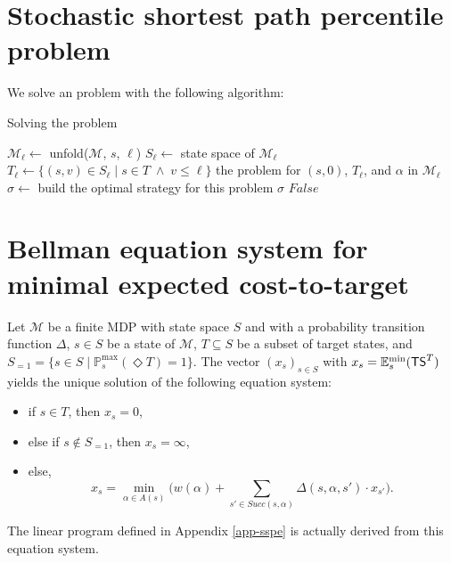 \section{Stochastic shortest path percentile problem}
\label{sspp-appendix}
We solve an \SSPP{} problem with the following algorithm:
\begin{algorithm}
\caption{Solving the \SSPP{} problem}
\label{sspp-algo}
\begin{algorithmic}[1]
\STATE $\mathcal{M}_\ell \leftarrow$ {\sffamily unfold($\mathcal{M}$, $s$, $\ell$)}
\STATE $S_\ell \leftarrow $ state space of $\mathcal{M}_\ell$
\STATE $T_\ell \leftarrow \{ (s, v) \in S_\ell \; | \; s \in T \; \wedge \; v \leq \ell \}$
 the \SR{} problem for $(s, 0)$, $T_\ell$, and $\alpha$ in $\mathcal{M}_\ell$
	\STATE $\sigma \leftarrow$ {\sffamily build} the optimal strategy for this \SR{} problem
	\RETURN $\sigma$
\ELSE
	\RETURN $False$
\ENDIF
\end{algorithmic}
\end{algorithm}

\addtocounter{chapter}{1}
\setcounter{section}{0}
\section{Bellman equation system for minimal expected cost-to-target} \label{bellman2}
  Let $\mathcal{M}$ be a finite MDP with state space $S$ and with a probability transition function $\Delta$, $s \in S$ be a state of $\mathcal{M}$, $T \subseteq S$ be a subset of target states, and
	$S_{=1} = \{s \in S \; | \; \mathbb{P}^{\max}_s(\Diamond T) = 1 \}$.
	The vector $(x_s)_{s \in S}$ with $x_s = \mathbb{E}_s^{\min}(\text{\sffamily TS}^T)$ yields the unique solution of the following equation system:
  \begin{itemize}
    \item if $s \in T$, then $x_s=0$,
    \item else if $s \not \in S_{=1}$, then $x_s=\infty$,
    \item else,
    \[ x_s = \min_{\alpha \in A(s)} \big( w(\alpha) + \sum_{s' \in Succ(s, \alpha)} \Delta(s, \alpha, s') \cdot x_{s'} \big). \]
  \end{itemize}
The linear program defined in Appendix \ref{app-sspe} is actually derived from this equation system.

